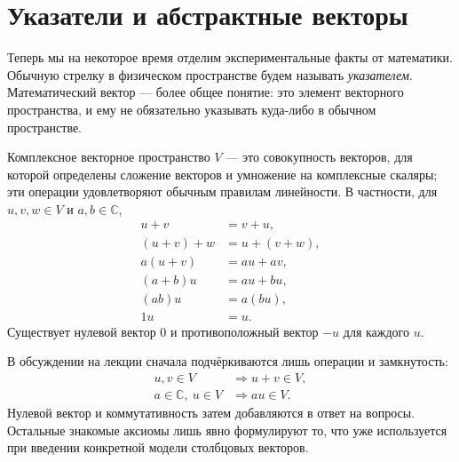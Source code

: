 \begin{classroomqa}
\end{classroomqa}

\section{Указатели и абстрактные векторы}

Теперь мы на некоторое время отделим экспериментальные факты от математики. Обычную стрелку в физическом пространстве будем называть \emph{указателем}. Математический вектор — более общее понятие: это элемент векторного пространства, и ему не обязательно указывать куда-либо в обычном пространстве.

\begin{definition}
Комплексное векторное пространство \(V\) — это совокупность векторов, для которой определены сложение векторов и умножение на комплексные скаляры; эти операции удовлетворяют обычным правилам линейности. В частности, для \(u,v,w\in V\) и \(a,b\in\mathbb C\),
\begin{align}
  u+v&=v+u,\\
  (u+v)+w&=u+(v+w),\\
  a(u+v)&=au+av,\\
  (a+b)u&=au+bu,\\
  (ab)u&=a(bu),\\
  1u&=u.
\end{align}
Существует нулевой вектор \(0\) и противоположный вектор \(-u\) для каждого \(u\).
\end{definition}

В обсуждении на лекции сначала подчёркиваются лишь операции и замкнутость:
\begin{equation}
\begin{aligned}
  u,v\in V&\Longrightarrow u+v\in V,\\
  a\in\mathbb C,\ u\in V&\Longrightarrow au\in V.
\end{aligned}
\end{equation}
Нулевой вектор и коммутативность затем добавляются в ответ на вопросы. Остальные знакомые аксиомы лишь явно формулируют то, что уже используется при введении конкретной модели столбцовых векторов.

